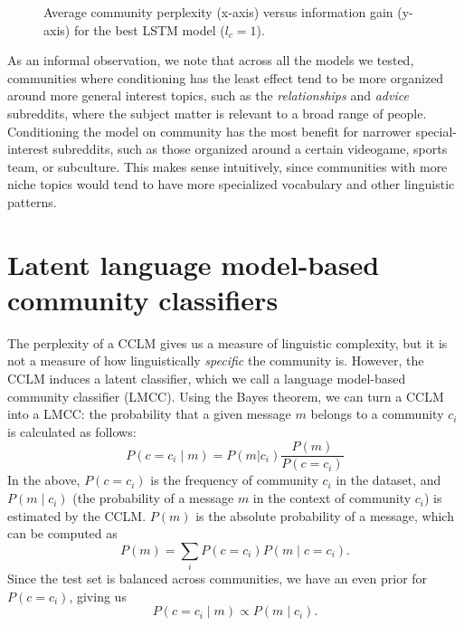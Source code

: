 \documentclass[11pt]{article}
\newcommand\Ppl{\mathsf{Ppl}}
\newcommand\IG{\mathsf{IG}}
\begin{document}
\begin{figure}
\caption{
  Average community perplexity (x-axis) versus information gain (y-axis)
  for the best LSTM model ($l_c = 1$).
}
\label{fig:ppl-info-gain}
\end{figure}

As an informal observation, we note that across all the models we
tested, communities where conditioning has the least effect tend to be
more organized around more general interest topics, such as the
\emph{relationships} and \emph{advice} subreddits, where the subject
matter is relevant to a broad range of people.  Conditioning the model
on community has the most benefit for narrower special-interest
subreddits, such as those organized around a certain videogame, sports
team, or subculture.  This makes sense intuitively, since communities
with more niche topics would tend to have more specialized vocabulary
and other linguistic patterns.

\section{Latent language model-based community classifiers}

The perplexity of a CCLM gives us a measure of linguistic complexity,
but it is not a measure of how linguistically \emph{specific} the
community is. However, the CCLM induces a latent classifier,
which we call a language model-based community classifier
(LMCC). Using the Bayes theorem, we can turn a
CCLM into a LMCC: the probability that a given message $m$
belongs to a community $c_i$ is calculated as follows:
\[P(c=c_i \mid m) = P(m | c_i)\frac {P(m)} {P(c=c_i)}\]
In the above,
$P(c=c_i)$ is the frequency of community $c_i$ in the dataset, and
$P(m \mid c_i)$ (the probability of a message $m$
in the context of community $c_i$) is estimated by the CCLM. 
$P(m)$ is the absolute
probability of a message, which can be computed as
\[P(m) = \sum_i P(c=c_i) P(m\mid c=c_i ). \]
Since the test set is balanced across communities,
we have an even prior for $P(c=c_i)$, giving us
\[P(c=c_i\mid m) \propto  P(m\mid c_i).\]
\end{document}
